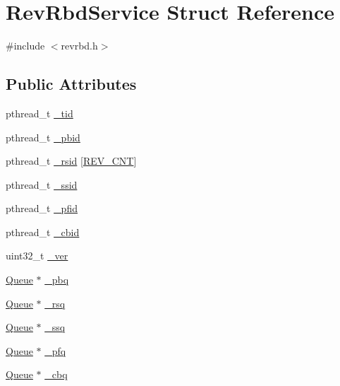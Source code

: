 \hypertarget{structRevRbdService}{\section{\-Rev\-Rbd\-Service \-Struct \-Reference}
\label{structRevRbdService}
}


{\ttfamily \#include $<$revrbd.\-h$>$}

\subsection*{\-Public \-Attributes}
\begin{DoxyCompactItemize}
\item 
pthread\-\_\-t \hyperlink{structRevRbdService_a13d86de95b0170261f8f2b71e834cb33}{\-\_\-tid}
\item 
pthread\-\_\-t \hyperlink{structRevRbdService_ab34a1bcdcea1dac8a7fceaf6d811df7b}{\-\_\-pbid}
\item 
pthread\-\_\-t \hyperlink{structRevRbdService_af488d651610680160d538fb9a1e65d11}{\-\_\-rsid} \mbox{[}\hyperlink{revdedup_8h_a7c4a19f561ae530b98cd1cf1794c6988}{\-R\-E\-V\-\_\-\-C\-N\-T}\mbox{]}
\item 
pthread\-\_\-t \hyperlink{structRevRbdService_a12f3281b79e0f571c9487a3bd6b5e5a1}{\-\_\-ssid}
\item 
pthread\-\_\-t \hyperlink{structRevRbdService_abba6684c1168e9eaaa4d53d6e547ccbc}{\-\_\-pfid}
\item 
pthread\-\_\-t \hyperlink{structRevRbdService_a427dc474e0daee01da054c009ef6b9ac}{\-\_\-cbid}
\item 
uint32\-\_\-t \hyperlink{structRevRbdService_a5f44c03ae393a24c1bf680fea3106e1c}{\-\_\-ver}
\item 
\hyperlink{structQueue}{\-Queue} $\ast$ \hyperlink{structRevRbdService_a2b03ba1799bc5b0749633860e265d9b6}{\-\_\-pbq}
\item 
\hyperlink{structQueue}{\-Queue} $\ast$ \hyperlink{structRevRbdService_ad51b5fc844ba1061968692a4eb141d8f}{\-\_\-rsq}
\item 
\hyperlink{structQueue}{\-Queue} $\ast$ \hyperlink{structRevRbdService_a292a68eff77497c9fbc1db43d1833354}{\-\_\-ssq}
\item 
\hyperlink{structQueue}{\-Queue} $\ast$ \hyperlink{structRevRbdService_ad55d2145589178ad0e49d6484a4b0b85}{\-\_\-pfq}
\item 
\hyperlink{structQueue}{\-Queue} $\ast$ \hyperlink{structRevRbdService_a01ff6e2738fc213742c7f82af459c7fe}{\-\_\-cbq}

\end{DoxyCompactItemize}
